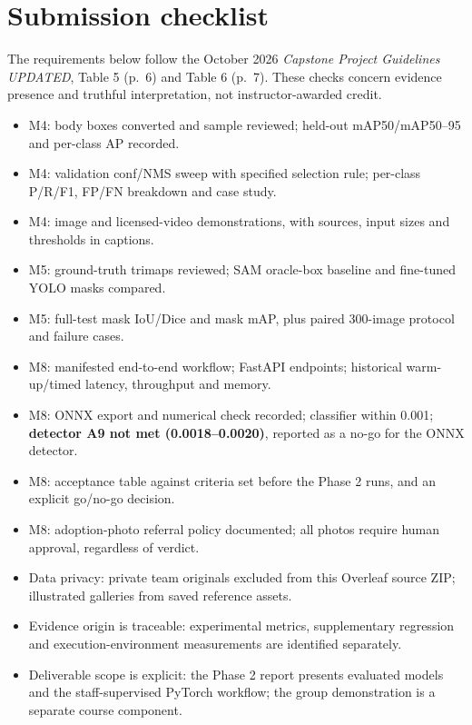 \documentclass[11pt,a4paper]{article}
\begin{document}
\section{Submission checklist}
The requirements below follow the October 2026 \emph{Capstone Project Guidelines UPDATED}, Table 5 (p.~6) and Table 6 (p.~7). These checks concern evidence presence and truthful interpretation, not instructor-awarded credit.
\begin{itemize}[leftmargin=1.45em,itemsep=6pt]
\item[$\checkmark$] M4: body boxes converted and sample reviewed; held-out mAP50/mAP50--95 and per-class AP recorded.
\item[$\checkmark$] M4: validation conf/NMS sweep with specified selection rule; per-class P/R/F1, FP/FN breakdown and case study.
\item[$\checkmark$] M4: image and licensed-video demonstrations, with sources, input sizes and thresholds in captions.
\item[$\checkmark$] M5: ground-truth trimaps reviewed; SAM oracle-box baseline and fine-tuned YOLO masks compared.
\item[$\checkmark$] M5: full-test mask IoU/Dice and mask mAP, plus paired 300-image protocol and failure cases.
\item[$\checkmark$] M8: manifested end-to-end workflow; FastAPI endpoints; historical warm-up/timed latency, throughput and memory.
\item[$\circ$] M8: ONNX export and numerical check recorded; classifier within 0.001; \textbf{detector A9 not met (0.0018--0.0020)}, reported as a no-go for the ONNX detector.
\item[$\checkmark$] M8: acceptance table against criteria set before the Phase 2 runs, and an explicit go/no-go decision.
\item[$\checkmark$] M8: adoption-photo referral policy documented; all photos require human approval, regardless of verdict.
\item[$\checkmark$] Data privacy: private team originals excluded from this Overleaf source ZIP; illustrated galleries from saved reference assets.
\item[$\checkmark$] Evidence origin is traceable: experimental metrics, supplementary regression and execution-environment measurements are identified separately.
\item[$\checkmark$] Deliverable scope is explicit: the Phase 2 report presents evaluated models and the staff-supervised PyTorch workflow; the group demonstration is a separate course component.
\end{itemize}
\end{document}

